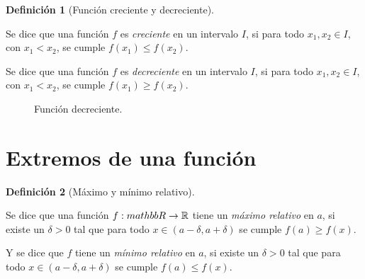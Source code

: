 \documentclass[
  a4paper,
]{scrreport}
\theoremstyle{plain}
\theoremstyle{plain}
\theoremstyle{definition}
\newtheorem{definition}{Definición}[chapter]
\theoremstyle{definition}
\theoremstyle{plain}
\theoremstyle{remark}
\begin{document}
\leavevmode{}%
\begin{definition}[Función creciente y
decreciente]\label{def-crecimiento-funcion}

Se dice que una función \(f\) es \emph{creciente} en un intervalo \(I\),
si para todo \(x_1,x_2\in I\), con \(x_1<x_2\), se cumple
\(f(x_1)\leq f(x_2)\).

Se dice que una función \(f\) es \emph{decreciente} en un intervalo
\(I\), si para todo \(x_1,x_2\in I\), con \(x_1<x_2\), se cumple
\(f(x_1)\geq f(x_2)\).

\end{definition}

\begin{figure}

\begin{minipage}[t]{0.50\linewidth}

{\centering 

\raisebox{-\height}{



}

\caption{Función creciente.}

}

\end{minipage}%
%
\begin{minipage}[t]{0.50\linewidth}

{\centering 

\raisebox{-\height}{



}

\caption{Función decreciente.}

}

\end{minipage}%

\end{figure}

\hypertarget{extremos-de-una-funciuxf3n}{%
\section{Extremos de una función}\label{extremos-de-una-funciuxf3n}}

\leavevmode{}%
\begin{definition}[Máximo y mínimo relativo]\label{def-extremos-funcion}

Se dice que una función \(f:\\mathbb{R}\rightarrow\mathbb{R}\) tiene un
\emph{máximo relativo} en \(a\), si existe un \(\delta>0\) tal que para
todo \(x\in (a-\delta,a+\delta)\) se cumple \(f(a)\geq f(x)\).

Y se dice que \(f\) tiene un \emph{mínimo relativo} en \(a\), si existe
un \(\delta>0\) tal que para todo \(x\in (a-\delta,a+\delta)\) se cumple
\(f(a)\leq f(x)\).

\end{definition}
\end{document}
